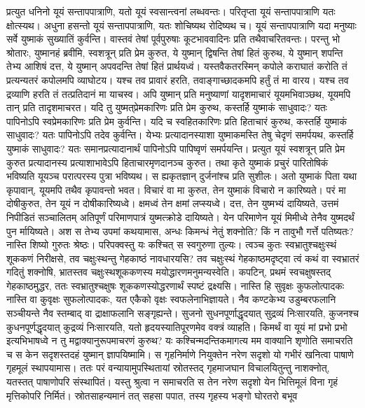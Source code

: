 \vakya प्रत्युत धनिनो यूयं सन्तापपात्राणि, यतो यूयं स्वसान्त्वनां लब्धवन्तः।
\vakya परितृप्ता यूयं सन्तापपात्राणि यतः क्षोत्स्यथ।
\vakya अधुना हसन्तो यूयं सन्तापपात्राणि, यतः शोचिष्यथ रोदिष्यथ च। यूयं सन्तापपात्राणि यदा मनुष्याः सर्वे युष्माकं सुख्यातिं कुर्वन्ति। वास्तवं तेषां पूर्वपुरुषाः कूटभाववादिनः प्रति तथैवाचरितवन्तः।
\vakya परन्तु भो श्रोतारः, युष्मानहं ब्रवीमि, स्वशत्रून् प्रति प्रेम कुरुत, ये युष्मान् द्विषन्ति तेषां हितं कुरुथ,
\vakya ये युष्मान् शपन्ति तेभ्य आशिषं दत्त, ये युष्मान् अपवदन्ति तेषां हितं प्रार्थयध्वं।
\vakya यस्तवैकतरस्मिन् कपोले कराघातं करोति तं प्रत्यन्यतरं कपोलमपि व्याघोटय। यश्च तव प्रावारं हरति, तवाङ्गाच्छादकमपि हर्तुं तं मा वारय।
\vakya यश्च तव द्रव्याणि हरति तं तत्प्रतिदानं मा याचस्व।
\vakya अपि युष्मान् प्रति मनुष्याणां यादृशमाचारं यूयमभिवाञ्छथ, यूयमपि तान् प्रति तादृशमाचरत।
\vakya यदि तु युष्मत्‌प्रेमकारिणः प्रति प्रेम कुरुथ, कस्तर्हि युष्माकं साधुवादः? यतः पापिनोऽपि स्वप्रेमकारिणः प्रति प्रेम कुर्वन्ति।
\vakya यदि च स्वहितकारिणः प्रति हिताचारं कुरुथ, कस्तर्हि युष्माकं साधुवादः? यतः पापिनोऽपि तदेव कुर्वन्ति।
\vakya येभ्यः प्रत्यादानस्याशा युष्माकमस्ति तेषु चेदृणं समर्पयथ, कस्तर्हि युष्माकं साधुवादः? यतः समानप्रत्यादानार्थं पापिनोऽपि पापिष्वृणं समर्पयन्ति।
\vakya प्रत्युत यूयं स्वशत्रून् प्रति प्रेम कुरुत प्रत्यादानस्य प्रत्याशाभावेऽपि हिताचारमृणदानञ्च कुरुत। तथा कृते युष्माकं प्रचुरं पारितोषिकं भविष्यति यूयञ्च परात्परस्य पुत्रा भविष्यथ।
\vakya स ह्यकृतज्ञान् दुर्जनांश्च प्रति सुशीलः। अतो युष्माकं पिता यथा कृपावान्, यूयमपि तथैव कृपावन्तो भवत।
\vakya विचारं वा मा कुरुत, तेन युष्माकं विचारो न कारिष्यते। परं मा दोषीकुरुत, तेन यूयं न दोषीकारिष्यध्वे। क्षमध्वं तेन क्षमां लप्स्यध्वे।
\vakya दत्त, तेन युष्मभ्यं दायिष्यते, उत्तमं निपीडितं सञ्चालितम् अतिपूर्णं परिमाणपात्रं युष्मत्क्रोडे दायिष्यते। येन परिमाणेन यूयं मिमीध्वे तेनैव युष्मदर्थं पुन र्मायिष्यते।
\vakya अश स तेभ्य उपमां कथयामास, अन्धः किमन्धं नेतुं शक्नोति? किं न तावुभौ गर्त्ते पतिष्यतः?
\vakya नास्ति शिष्यो गुरुतः श्रेष्ठः।
\vakya परिपक्वस्तु यः कश्चित् स स्वगुरुणा तुल्यः।
\vakya त्वञ्च कुतः स्वभ्रातुश्चक्षुःस्थं शूककणं निरीक्षसे, तव चक्षुःस्थन्तु गेहकाष्ठं नावधारयसि? तव चक्षुःस्थं गेहकाष्ठमदृष्ट्वा त्वं कथं वा स्वभ्रातरं गदितुं शक्नोषि, भ्रातस्तव चक्षुःस्थशूककणस्य मयोद्धारणमनुमन्यस्वेति। कपटिन्, प्रथमं स्वचक्षुषस्तद् गेहकाष्ठमुद्धर, ततः स्वभ्रातुश्चक्षुषः शूककणस्योद्धरणार्थं स्पष्टं द्रक्ष्यसि।
\vakya नास्ति हि सुवृक्षः कुफलोत्पादकः नास्ति वा कुवृक्षः सुफलोत्पादकः, यत एकैको वृक्षः स्वफलेनाभिज्ञायते।
\vakya नैव कण्टकेभ्य उडुम्बरफलानि सञ्चीयन्ते नैव स्तम्बाद् वा द्राक्षाफलानि सङ्गृह्यन्ते।
\vakya सुजनो सुधनपूर्णाद्धृदयात् सुद्रव्यं निःसारयति, कुजनश्च कुधनपूर्णद्धृदयात् कुद्रव्यं निःसारयति, यतो हृदयस्यातिपूरणमेव वक्त्रं व्याहति।
\vakya किमर्थं वा यूयं मां प्रभो प्रभो इत्यभिभाषध्वे न तु मद्वाक्यानुरूपमाचरणं कुरुथ?
\vakya यः कश्चिन्मदन्तिकमागत्य मम वाक्यानि शृणोति समाचरति च स केन सदृशस्तदहं युष्मान् ज्ञापयिष्मामि।
\vakya स गृहनिर्माणे नियुक्तेन नरेण सदृशो यो गभीरं खनित्वा पाषाणे गृहमूलं स्थापयामास। ततः परं वन्यायामुपस्थितायां स्रोतस्तद् गृहमाजघान विचालयितुन्तु नाशक्नोत्, यतस्तत् पाषाणोपरि संस्थापितं।
\vakya यस्तु श्रुत्वा न समाचरति स तेन नरेण सदृशो येन भित्तिमूलं विना गृहं मृत्तिकोपरि निर्मितं। स्रोतसाहन्यमानं तत् सहसा पपात, तस्य गृहस्य भङ्गो घोरतरो बभूव\eoc